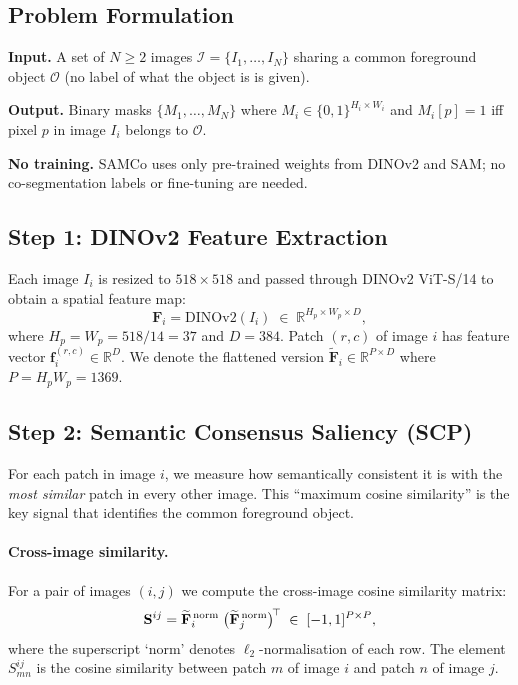 \documentclass[10pt,twocolumn,letterpaper]{article}
\begin{document}
\subsection{Problem Formulation}

\textbf{Input.}
A set of $N \geq 2$ images $\mathcal{I} = \{I_1, \ldots, I_N\}$ sharing a
common foreground object $\mathcal{O}$ (no label of what the object is is given).

\textbf{Output.}
Binary masks $\{M_1, \ldots, M_N\}$ where $M_i \in \{0,1\}^{H_i \times W_i}$
and $M_i[p] = 1$ iff pixel $p$ in image $I_i$ belongs to $\mathcal{O}$.

\textbf{No training.}
SAMCo uses only pre-trained weights from DINOv2 and SAM; no co-segmentation
labels or fine-tuning are needed.

\subsection{Step 1: DINOv2 Feature Extraction}

Each image $I_i$ is resized to $518 \times 518$ and passed through DINOv2
ViT-S/14 to obtain a spatial feature map:
\begin{equation}
  \mathbf{F}_i = \text{DINOv2}(I_i) \;\in\; \mathbb{R}^{H_p \times W_p \times D},
\end{equation}
where $H_p = W_p = 518/14 = 37$ and $D = 384$.
Patch $(r,c)$ of image $i$ has feature vector
$\mathbf{f}_i^{(r,c)} \in \mathbb{R}^D$.
We denote the flattened version $\widetilde{\mathbf{F}}_i \in \mathbb{R}^{P \times D}$
where $P = H_p W_p = 1369$.

\subsection{Step 2: Semantic Consensus Saliency (SCP)}
\label{sec:scp}

\begin{tcolorbox}[title={\textbf{Novelty: Semantic Consensus Prompting (SCP)}}]
For each patch in image $i$, we measure how semantically consistent it is with
the \emph{most similar} patch in every other image.
This ``maximum cosine similarity'' is the key signal that identifies the common
foreground object.
\end{tcolorbox}

\paragraph{Cross-image similarity.}
For a pair of images $(i, j)$ we compute the cross-image cosine similarity
matrix:
\begin{equation}
  \mathbf{S}^{ij} = \widetilde{\mathbf{F}}_i^{\,\normalfont\text{norm}} \;
                    \bigl(\widetilde{\mathbf{F}}_j^{\,\normalfont\text{norm}}\bigr)^{\!\top}
                    \;\in\; [-1,1]^{P \times P},
\end{equation}
where the superscript `norm' denotes $\ell_2$-normalisation of each row.
The element $S^{ij}_{mn}$ is the cosine similarity between patch $m$ of image $i$
and patch $n$ of image $j$.
\end{document}
